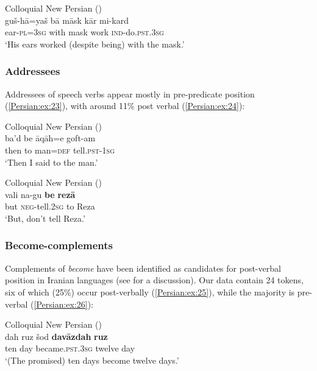 \documentclass[output=paper,colorlinks,citecolor=brown,draftmode]{langscibook}
\begin{document}
\ea\label{Persian:ex:22}
Colloquial New Persian (\citealt[O, 1763]{Izadi2022Persian}) \\
\gll guš-hā=yaš bā māsk kār mi-kard \\
ear\textsc{-pl=3sg} with mask work \textsc{ind-}do\textsc{.pst.3sg} \\
\glt `His ears worked (despite being) with the mask.'
\z

\subsubsection{Addressees}

Addressees of speech verbs appear mostly in pre-predicate position (\ref{Persian:ex:23}), with around 11\% post verbal (\ref{Persian:ex:24}):

\ea\label{Persian:ex:23}
Colloquial New Persian (\citealt[O, 1747]{Izadi2022Persian}) \\
\gll ba'd be āqāh=e goft-am \\
then to man\textsc{=def} tell\textsc{.pst-1sg} \\
\glt `Then I said to the man.'
\z

\ea\label{Persian:ex:24}
Colloquial New Persian (\citealt[F, 0630]{Izadi2022Persian}) \\
\gll vali na-gu \textbf{be} \textbf{rezā} \\
but \textsc{neg-}tell\textsc{.2sg} to Reza \\
\glt `But, don't tell Reza.'
\z

\subsubsection{Become-complements}


Complements of \textit{become} have been identified as candidates for post-verbal position in Iranian languages (see \citealt{Korn2022Targets} for a discussion). Our data contain 24 tokens, six of which (25\%) occur post-verbally (\ref{Persian:ex:25}), while the majority is pre-verbal (\ref{Persian:ex:26}): 

\ea\label{Persian:ex:25}
Colloquial New Persian (\citealt[ZC, 3104]{Izadi2022Persian}) \\
\gll dah ruz šod \textbf{davāzdah} \textbf{ruz} \\
ten day became\textsc{.pst.3sg} twelve day \\
\glt `(The promised) ten days become twelve days.'
\z
\end{document}
